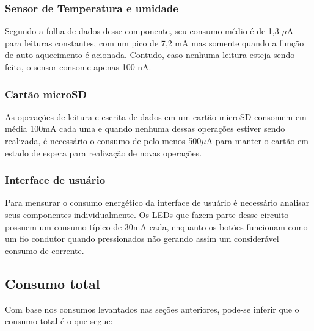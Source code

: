 \subsubsection{Sensor de Temperatura e umidade}
 
 Segundo a folha de dados desse componente, seu consumo médio é de 1,3 $\mu$A para leituras constantes, com um pico de 7,2 mA mas somente quando a função de auto aquecimento é acionada. Contudo, caso nenhuma leitura esteja sendo feita, o sensor consome apenas 100 nA.

\subsubsection{Cartão microSD}  

As operações de leitura e escrita de dados em um cartão microSD consomem em média 100mA cada uma e quando nenhuma dessas operações estiver sendo realizada, é necessário o consumo de pelo menos 500$\mu$A para manter o cartão em estado de espera para realização de novas operações. 


\subsubsection{Interface de usuário}  

Para mensurar o consumo energético da interface de usuário é necessário analisar seus componentes individualmente. Os LEDs que fazem parte desse circuito possuem um consumo típico de 30mA cada, enquanto os botões funcionam como um fio condutor quando pressionados não gerando assim um considerável consumo de corrente. 


\subsection{Consumo total}

Com base nos consumos levantados nas seções anteriores, pode-se inferir que o consumo total é o que segue:

